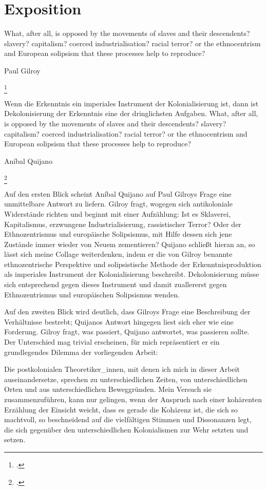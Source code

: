 \section{Exposition}
\epigraph{
    What, after all, is opposed by the movements of slaves and their descendents?
slavery? capitalism? coerced industrialisation? racial terror?
or the ethnocentrism and European solipsism that these processes help to reproduce?
}{Paul Gilroy\footnotemark}\footcitetext{gilroyatlantic} 

\epigraph{ Wenn die Erkenntnis ein imperiales Instrument der Kolonialisierung
ist, dann ist Dekolonisierung der Erkenntnis eine der dringlichsten Aufgaben.
What, after all, is opposed by the movements of slaves and their descendents?
slavery? capitalism? coerced industrialisation? racial terror?  or the
ethnocentrism and European solipsism that these processes help to reproduce?
}{Aníbal Quijano\footnotemark}\footcitetext{quijano}

Auf den ersten Blick scheint Aníbal Quijano auf Paul Gilroys Frage eine
unmittelbare Antwort zu liefern. Gilroy fragt, wogegen sich antikoloniale
Widerstände richten und beginnt mit einer Aufzählung: Ist es Sklaverei,
Kapitalismus, erzwungene Industrialisierung, rassistischer Terror? Oder der
Ethnozentrismus und europäische Solipsismus, mit Hilfe dessen sich jene
Zustände immer wieder von Neuem zementieren? Quijano schließt hieran an, so
lässt sich meine Collage weiterdenken, indem er die von Gilroy benannte
ethnozentrische Perspektive und solipsistische Methode der Erkenntnisproduktion
als imperiales Instrument der Kolonialisierung beschreibt. Dekolonisierung
müsse sich entsprechend gegen dieses Instrument und damit zuallererst gegen
Ethnozentrismus und europäischen Solipsismus wenden.

Auf den zweiten Blick wird deutlich, dass Gilroys Frage eine Beschreibung der
Verhältnisse bestrebt; Quijanos Antwort hingegen liest sich eher wie eine
Forderung. Gilroy fragt, was passiert, Quijano antwortet, was passieren sollte.
Der Unterschied mag trivial erscheinen, für mich repräsentiert er ein
grundlegendes Dilemma der vorliegenden Arbeit:

Die postkolonialen Theoretiker\_innen, mit denen ich mich in dieser Arbeit
auseinandersetze, sprechen zu unterschiedlichen Zeiten, von unterschiedlichen
Orten und aus unterschiedlichen Beweggründen. Mein Versuch sie
zusammenzuführen, kann nur gelingen, wenn der Anspruch nach einer kohärenten
Erzählung der Einsicht weicht, dass es gerade die Kohärenz ist, die sich so
machtvoll, so beschneidend auf die vielfältigen Stimmen und Dissonanzen legt,
die sich gegenüber den unterschiedlichen Kolonialismen zur Wehr setzten und
setzen.\\

